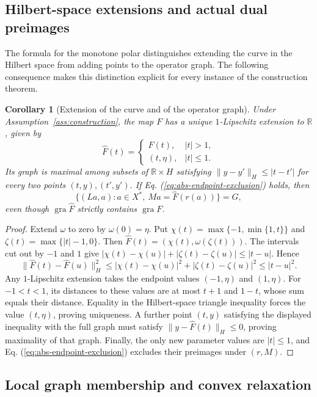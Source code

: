\documentclass[11pt]{article}
\newcommand{\R}{\mathbb R}
\newcommand{\gra}{\operatorname{gra}}
\newtheorem{corollary}{Corollary}
\theoremstyle{definition}
\theoremstyle{remark}
\begin{document}
\subsection{Hilbert-space extensions and actual dual preimages}
\label{subsec:appendix-profile-extension}

The formula for the monotone polar distinguishes extending the curve in the Hilbert space from adding points to the operator graph. The following consequence makes this distinction explicit for every instance of the construction theorem.

\begin{corollary}[Extension of the curve and of the operator graph]
\label{cor:profile-extension-recovered}
Under Assumption~\ref{ass:construction}, the map $F$ has a unique $1$-Lipschitz extension to $\R$, given by
\[
\widehat F(t)=
\begin{cases}F(t),&|t|>1,\\(t,\eta),&|t|\le1.\end{cases}
\]
Its graph is maximal among subsets of $\R\times H$ satisfying $\|y-y'\|_H\le|t-t'|$ for every two points $(t,y),(t',y')$. If Eq. (\ref{eq:abs-endpoint-exclusion}) holds, then
\[
\{(La,a):a\in X^*,\ Ma=\widehat F(r(a))\}=G,
\]
even though $\gra\widehat F$ strictly contains $\gra F$.
\end{corollary}
\begin{proof}
Extend $\omega$ to zero by $\omega(0)=\eta$. Put $\chi(t)=\max\{-1,\min\{1,t\}\}$ and $\zeta(t)=\max\{|t|-1,0\}$. Then $\widehat F(t)=(\chi(t),\omega(\zeta(t)))$. The intervals cut out by $-1$ and $1$ give $|\chi(t)-\chi(u)|+|\zeta(t)-\zeta(u)|\le|t-u|$. Hence
\[
\|\widehat F(t)-\widehat F(u)\|_H^2
\le |\chi(t)-\chi(u)|^2+|\zeta(t)-\zeta(u)|^2
\le |t-u|^2.
\]
Any $1$-Lipschitz extension takes the endpoint values $(-1,\eta)$ and $(1,\eta)$. For $-1<t<1$, its distances to these values are at most $t+1$ and $1-t$, whose sum equals their distance. Equality in the Hilbert-space triangle inequality forces the value $(t,\eta)$, proving uniqueness. A further point $(t,y)$ satisfying the displayed inequality with the full graph must satisfy $\|y-\widehat F(t)\|_H\le0$, proving maximality of that graph. Finally, the only new parameter values are $|t|\le1$, and Eq. (\ref{eq:abs-endpoint-exclusion}) excludes their preimages under $(r,M)$.
\end{proof}

\subsection{Local graph membership and convex relaxation}
\label{subsec:appendix-local-convex}
\end{document}
